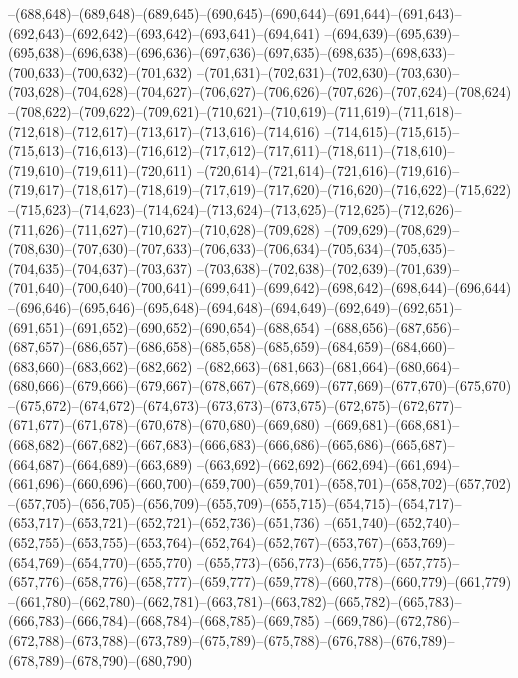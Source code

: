 --(688,648)--(689,648)--(689,645)--(690,645)--(690,644)--(691,644)--(691,643)--(692,643)--(692,642)--(693,642)--(693,641)--(694,641)
--(694,639)--(695,639)--(695,638)--(696,638)--(696,636)--(697,636)--(697,635)--(698,635)--(698,633)--(700,633)--(700,632)--(701,632)
--(701,631)--(702,631)--(702,630)--(703,630)--(703,628)--(704,628)--(704,627)--(706,627)--(706,626)--(707,626)--(707,624)--(708,624)
--(708,622)--(709,622)--(709,621)--(710,621)--(710,619)--(711,619)--(711,618)--(712,618)--(712,617)--(713,617)--(713,616)--(714,616)
--(714,615)--(715,615)--(715,613)--(716,613)--(716,612)--(717,612)--(717,611)--(718,611)--(718,610)--(719,610)--(719,611)--(720,611)
--(720,614)--(721,614)--(721,616)--(719,616)--(719,617)--(718,617)--(718,619)--(717,619)--(717,620)--(716,620)--(716,622)--(715,622)
--(715,623)--(714,623)--(714,624)--(713,624)--(713,625)--(712,625)--(712,626)--(711,626)--(711,627)--(710,627)--(710,628)--(709,628)
--(709,629)--(708,629)--(708,630)--(707,630)--(707,633)--(706,633)--(706,634)--(705,634)--(705,635)--(704,635)--(704,637)--(703,637)
--(703,638)--(702,638)--(702,639)--(701,639)--(701,640)--(700,640)--(700,641)--(699,641)--(699,642)--(698,642)--(698,644)--(696,644)
--(696,646)--(695,646)--(695,648)--(694,648)--(694,649)--(692,649)--(692,651)--(691,651)--(691,652)--(690,652)--(690,654)--(688,654)
--(688,656)--(687,656)--(687,657)--(686,657)--(686,658)--(685,658)--(685,659)--(684,659)--(684,660)--(683,660)--(683,662)--(682,662)
--(682,663)--(681,663)--(681,664)--(680,664)--(680,666)--(679,666)--(679,667)--(678,667)--(678,669)--(677,669)--(677,670)--(675,670)
--(675,672)--(674,672)--(674,673)--(673,673)--(673,675)--(672,675)--(672,677)--(671,677)--(671,678)--(670,678)--(670,680)--(669,680)
--(669,681)--(668,681)--(668,682)--(667,682)--(667,683)--(666,683)--(666,686)--(665,686)--(665,687)--(664,687)--(664,689)--(663,689)
--(663,692)--(662,692)--(662,694)--(661,694)--(661,696)--(660,696)--(660,700)--(659,700)--(659,701)--(658,701)--(658,702)--(657,702)
--(657,705)--(656,705)--(656,709)--(655,709)--(655,715)--(654,715)--(654,717)--(653,717)--(653,721)--(652,721)--(652,736)--(651,736)
--(651,740)--(652,740)--(652,755)--(653,755)--(653,764)--(652,764)--(652,767)--(653,767)--(653,769)--(654,769)--(654,770)--(655,770)
--(655,773)--(656,773)--(656,775)--(657,775)--(657,776)--(658,776)--(658,777)--(659,777)--(659,778)--(660,778)--(660,779)--(661,779)
--(661,780)--(662,780)--(662,781)--(663,781)--(663,782)--(665,782)--(665,783)--(666,783)--(666,784)--(668,784)--(668,785)--(669,785)
--(669,786)--(672,786)--(672,788)--(673,788)--(673,789)--(675,789)--(675,788)--(676,788)--(676,789)--(678,789)--(678,790)--(680,790)
